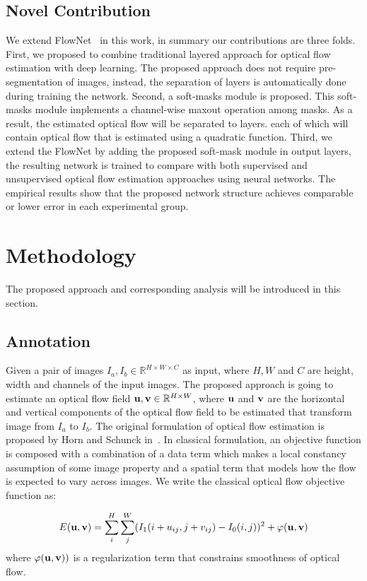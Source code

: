 \documentclass[10pt,twocolumn,letterpaper]{article}
\begin{document}
\subsection{Novel Contribution}
We extend FlowNet~\cite{7410673} in this work, in summary our contributions are three folds. First, we proposed to combine traditional layered approach for optical flow estimation with deep learning. The proposed approach does not require pre-segmentation of images, instead, the separation of layers is automatically done during training the network. Second, a soft-masks module is proposed. This soft-masks module implements a channel-wise maxout operation among masks. As a result, the estimated optical flow will be separated to layers. each of which will contain optical flow that is estimated using a quadratic function. Third, we extend the FlowNet by adding the proposed soft-mask module in output layers, the resulting network is trained to compare with both supervised and unsupervised optical flow estimation approaches using neural networks. The empirical results show that the proposed network structure achieves comparable or lower error in each experimental group.

\section{Methodology}
The proposed approach and corresponding analysis will be introduced in this section.

\subsection{Annotation}
Given a pair of images $I_a, I_b \in \mathbb{R}^{H\times W\times C}$ as input, where $H, W$ and $C$ are height, width and channels of the input images. The proposed approach is going to estimate an optical flow field $\bold{u}, \bold{v} \in \mathbb{R}^{H\times W}$, where $\bold{u}$ and $\bold{v}$ are the horizontal and vertical components of the optical flow field to be estimated that transform image from $I_a$ to $I_b$. The original formulation of optical flow estimation is proposed by Horn and Schunck in~\cite{horn1981determining}. In classical formulation, an objective function is composed with a combination of a data term which makes a local constancy assumption of some image property and a spatial term that models how the flow is expected to vary across images. We write the classical optical flow objective function as:

\begin{equation}
\label{eqn: wrong obj}
E(\bold{u}, \bold{v}) = \sum_{i}^H\sum_{j}^W (I_1(i+u_{ij}, j+v_{ij}) - I_0(i, j))^2 + \varphi(\bold{u, v})
\end{equation}
where $\varphi(\bold{u}, \bold{v}))$ is a regularization term that constrains smoothness of optical flow. 
\end{document}
